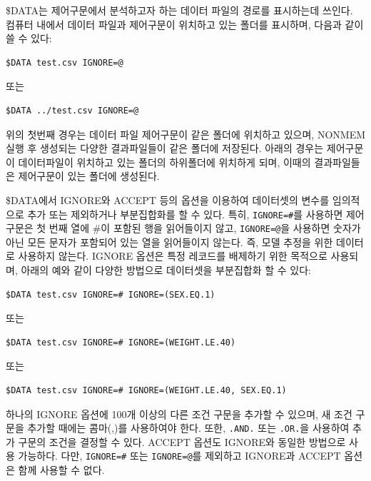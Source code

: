 \documentclass[
  11pt,
  krantz2, a4paper, twoside]{krantz}
\theoremstyle{definition}
\theoremstyle{definition}
\theoremstyle{definition}
\theoremstyle{remark}
\begin{document}
\$DATA는 제어구문에서 분석하고자 하는 데이터 파일의 경로를 표시하는데 쓰인다. 컴퓨터 내에서 데이터 파일과 제어구문이 위치하고 있는 폴더를 표시하며, 다음과 같이 쓸 수 있다:

\begin{verbatim}
$DATA test.csv IGNORE=@
\end{verbatim}

또는

\begin{verbatim}
$DATA ../test.csv IGNORE=@
\end{verbatim}

위의 첫번째 경우는 데이터 파일 제어구문이 같은 폴더에 위치하고 있으며, NONMEM 실행 후 생성되는 다양한 결과파일들이 같은 폴더에 저장된다. 아래의 경우는 제어구문이 데이터파일이 위치하고 있는 폴더의 하위폴더에 위치하게 되며, 이때의 결과파일들은 제어구문이 있는 폴더에 생성된다.

\$DATA에서 IGNORE와 ACCEPT 등의 옵션을 이용하여 데이터셋의 변수를 임의적으로 추가 또는 제외하거나 부분집합화를 할 수 있다. 특히, \texttt{IGNORE=\#}를 사용하면 제어구문은 첫 번째 열에 \#이 포함된 행을 읽어들이지 않고, \texttt{IGNORE=@}을 사용하면 숫자가 아닌 모든 문자가 포함되어 있는 열을 읽어들이지 않는다. 즉, 모델 추정을 위한 데이터로 사용하지 않는다. IGNORE 옵션은 특정 레코드를 배제하기 위한 목적으로 사용되며, 아래의 예와 같이 다양한 방법으로 데이터셋을 부분집합화 할 수 있다:

\begin{verbatim}
$DATA test.csv IGNORE=# IGNORE=(SEX.EQ.1)
\end{verbatim}

또는

\begin{verbatim}
$DATA test.csv IGNORE=# IGNORE=(WEIGHT.LE.40)
\end{verbatim}

또는

\begin{verbatim}
$DATA test.csv IGNORE=# IGNORE=(WEIGHT.LE.40, SEX.EQ.1)
\end{verbatim}

하나의 IGNORE 옵션에 100개 이상의 다른 조건 구문을 추가할 수 있으며, 새 조건 구문을 추가할 때에는 콤마(,)를 사용하여야 한다. 또한, \texttt{.AND.} 또는 \texttt{.OR.}을 사용하여 추가 구문의 조건을 결정할 수 있다. ACCEPT 옵션도 IGNORE와 동일한 방법으로 사용 가능하다. 다만, \texttt{IGNORE=\#} 또는 \texttt{IGNORE=@}를 제외하고 IGNORE과 ACCEPT 옵션은 함께 사용할 수 없다.
\end{document}
